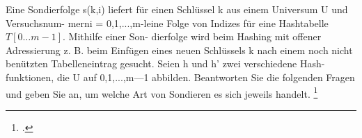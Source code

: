\documentclass{bschlangaul-aufgabe}
\begin{document}

Eine Sondierfolge s(k,i) liefert für einen Schlüssel k aus einem
Universum U und Versuchsnum- merni = 0,1,...,m-leine Folge von Indizes
für eine Hashtabelle $T[0\dots m-1]$. Mithilfe einer Son- dierfolge wird beim
Hashing mit offener Adressierung z. B. beim Einfügen eines neuen
Schlüssels k nach einem noch nicht benützten Tabelleneintrag gesucht.
Seien h und h’ zwei verschiedene Hash- funktionen, die U auf
{0,1,...,m—1} abbilden. Beantworten Sie die folgenden Fragen und geben
Sie an, um welche Art von Sondieren es sich jeweils handelt.
\footcite{examen:46115:2021:03}
\end{document}
